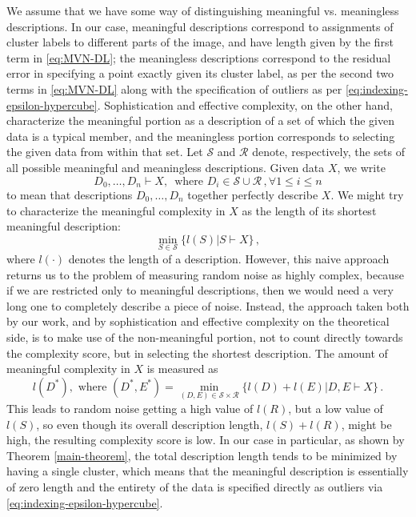 \documentclass[a4paper,fleqn]{cas-sc}
\theoremstyle{remark}
\begin{document}
We assume that we have some way of distinguishing meaningful vs. meaningless descriptions. In our case, meaningful descriptions correspond to assignments of cluster labels to different parts of the image, and have length given by the first term in \eqref{eq:MVN-DL}; the meaningless descriptions correspond to the residual error in specifying a point exactly given its cluster label, as per the second two terms in \eqref{eq:MVN-DL} along with the specification of outliers as per \eqref{eq:indexing-epsilon-hypercube}. Sophistication and effective complexity, on the other hand, characterize the meaningful portion as a description of a set of which the given data is a typical member, and the meaningless portion corresponds to selecting the given data from within that set. Let $\mathcal{S}$ and $\mathcal{R}$ denote, respectively, the sets of all possible meaningful and meaningless descriptions. Given data $X$, we write 
\begin{equation}
 D_0, \dots, D_n \vdash X,\, \text{ where } D_i \in \mathcal{S} \cup \mathcal{R}\,, \forall 1 \leq i \leq n
\end{equation}
to mean that descriptions $D_0, \dots, D_n$ together perfectly describe $X$. We might try to characterize the meaningful complexity in $X$ as the length of its shortest meaningful description:
\begin{equation}
    \min_{S \in \mathcal{S}} \{l(S) | S \vdash X\}\,,
\end{equation}
where $l(\cdot)$ denotes the length of a description. However, this naive approach returns us to the problem of measuring random noise as highly complex, because if we are restricted only to meaningful descriptions, then we would need a very long one to completely describe a piece of noise. Instead, the approach taken both by our work, and by sophistication and effective complexity on the theoretical side, is to make use of the non-meaningful portion, not to count directly towards the complexity score, but in selecting the shortest description. The amount of meaningful complexity in $X$ is measured as
\begin{equation}
    l(D^*), \text{  where  } (D^*,E^*) = \min_{(D,E) \in \mathcal{S} \times \mathcal{R}} \{l(D)+l(E) | D,E \vdash X\}\,.
\end{equation}
This leads to random noise getting a high value of $l(R)$, but a low value of $l(S)$, so even though its overall description length, $l(S) + l(R)$, might be high, the resulting complexity score is low. In our case in particular, as shown by Theorem \ref{main-theorem}, the total description length tends to be minimized by having a single cluster, which means that the meaningful description is essentially of zero length and the entirety of the data is specified directly as outliers via \eqref{eq:indexing-epsilon-hypercube}.
\end{document}
